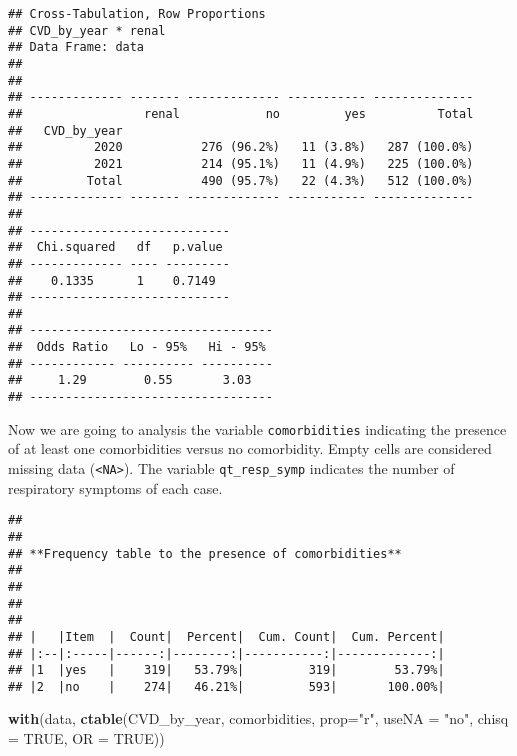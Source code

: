 \documentclass[
]{article}
\newenvironment{Shaded}{\begin{snugshade}}{\end{snugshade}}
\newcommand{\AttributeTok}[1]{\textcolor[rgb]{0.13,0.29,0.53}{#1}}
\newcommand{\ConstantTok}[1]{\textcolor[rgb]{0.56,0.35,0.01}{#1}}
\newcommand{\FunctionTok}[1]{\textcolor[rgb]{0.13,0.29,0.53}{\textbf{#1}}}
\newcommand{\NormalTok}[1]{#1}
\newcommand{\SpecialCharTok}[1]{\textcolor[rgb]{0.81,0.36,0.00}{\textbf{#1}}}
\newcommand{\StringTok}[1]{\textcolor[rgb]{0.31,0.60,0.02}{#1}}
\begin{document}
\begin{verbatim}
## Cross-Tabulation, Row Proportions  
## CVD_by_year * renal  
## Data Frame: data  
## 
## 
## ------------- ------- ------------- ----------- --------------
##                 renal            no         yes          Total
##   CVD_by_year                                                 
##          2020           276 (96.2%)   11 (3.8%)   287 (100.0%)
##          2021           214 (95.1%)   11 (4.9%)   225 (100.0%)
##         Total           490 (95.7%)   22 (4.3%)   512 (100.0%)
## ------------- ------- ------------- ----------- --------------
## 
## ----------------------------
##  Chi.squared   df   p.value 
## ------------- ---- ---------
##    0.1335      1    0.7149  
## ----------------------------
## 
## ----------------------------------
##  Odds Ratio   Lo - 95%   Hi - 95% 
## ------------ ---------- ----------
##     1.29        0.55       3.03   
## ----------------------------------
\end{verbatim}

Now we are going to analysis the variable \texttt{comorbidities}
indicating the presence of at least one comorbidities versus no
comorbidity. Empty cells are considered missing data
(\texttt{\textless{}NA\textgreater{}}). The variable
\texttt{qt\_resp\_symp} indicates the number of respiratory symptoms of
each case.

\begin{Shaded}
\end{Shaded}

\begin{verbatim}
## 
## 
## **Frequency table to the presence of comorbidities**   
## 
## 
## 
## 
## |   |Item  |  Count|  Percent|  Cum. Count|  Cum. Percent|
## |:--|:-----|------:|--------:|-----------:|-------------:|
## |1  |yes   |    319|   53.79%|         319|        53.79%|
## |2  |no    |    274|   46.21%|         593|       100.00%|
\end{verbatim}

\begin{Shaded}
\begin{Highlighting}[]
\FunctionTok{with}\NormalTok{(data, }\FunctionTok{ctable}\NormalTok{(CVD\_by\_year, comorbidities, }\AttributeTok{prop=}\StringTok{"r"}\NormalTok{, }\AttributeTok{useNA =} \StringTok{"no"}\NormalTok{, }\AttributeTok{chisq =} \ConstantTok{TRUE}\NormalTok{, }\AttributeTok{OR =} \ConstantTok{TRUE}\NormalTok{))}
\end{Highlighting}
\end{Shaded}
\end{document}
